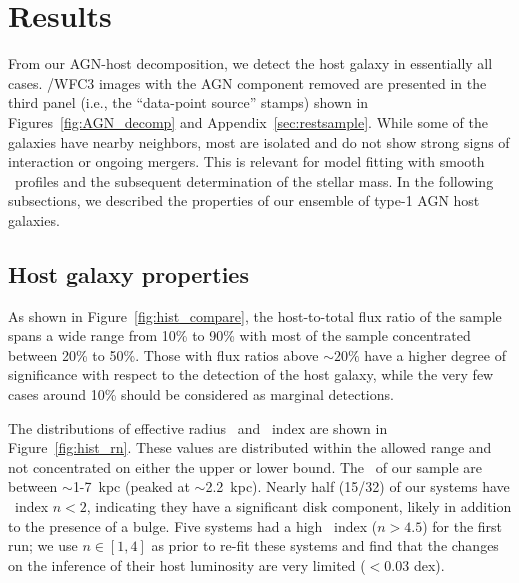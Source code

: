 \documentclass[apj]{emulateapj}
\begin{document}
\section{Results}
\label{sec:result}

From our AGN-host decomposition, we detect the host galaxy in essentially all cases. \hst/WFC3 images with the AGN component removed are presented in the third panel (i.e., the ``data-point source'' stamps) shown in Figures~\ref{fig:AGN_decomp} and Appendix~\ref{sec:restsample}. While some of the galaxies have nearby neighbors, most are isolated and do not show strong signs of interaction or ongoing mergers. This is relevant for model fitting with smooth \sersic\ profiles and the subsequent determination of the stellar mass. In the following subsections, we described the properties of our ensemble of type-1 AGN host galaxies.
 
\subsection{Host galaxy properties}
\label{sec:result-hosts}
As shown in Figure~\ref{fig:hist_compare}, the host-to-total flux ratio of the sample spans a wide range from 10\% to 90\% with most of the sample concentrated between 20\% to 50\%. Those with flux ratios above $\sim20\%$ have a higher degree of significance with respect to the detection of the host galaxy, while the very few cases around 10\% should be considered as marginal detections. 

The distributions of effective radius \Reff\ and \sersic\ index are shown in Figure~\ref{fig:hist_rn}. These values are distributed within the allowed range and not concentrated on either the upper or lower bound. The \Reff\ of our sample are between $\sim$1-7~kpc (peaked at $\sim$2.2~kpc). Nearly half (15/32) of our systems have \sersic\ index $n<2$, indicating they have a significant disk component, likely in addition to the presence of a bulge. Five systems had a high \sersic\ index ($n>4.5$) for the first run; we use $n\in[1,4]$ as prior to re-fit these systems and find that the changes on the inference of their host luminosity are very limited ($<0.03$ dex).
\end{document}

